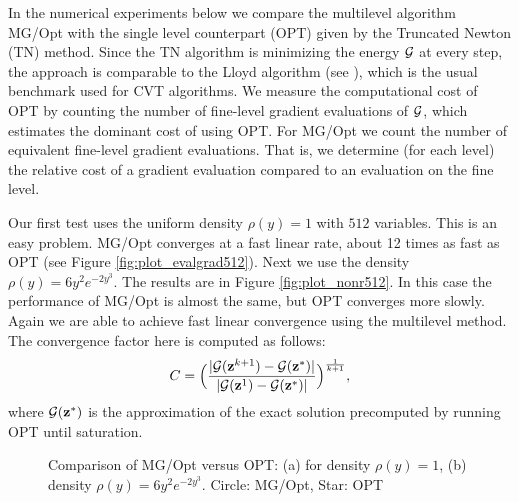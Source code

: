 \documentclass{siamltex}
\newcommand{\ds}{\displaystyle}
\begin{document}
In the numerical experiments below we compare the multilevel algorithm MG/Opt with the single level %
counterpart (OPT) given by the Truncated Newton (TN) method. Since the TN algorithm is minimizing the %
energy $\cg$ at every step, the approach is comparable %
to the Lloyd algorithm (see \cite{DEJ}), which is the usual benchmark used for CVT algorithms.  We measure the computational cost of OPT by counting the number of fine-level gradient evaluations of $\cg$, which estimates the dominant cost of using OPT.  For MG/Opt we count the number of equivalent fine-level gradient evaluations.  That is, we determine (for each level) the relative cost of a gradient evaluation compared to an evaluation on the fine level.

Our first test uses the uniform density $\rho(y) = 1$ with $512$ variables.  This is an easy problem.  MG/Opt converges at a fast linear rate, about 12 times as fast as OPT  (see Figure \ref{fig:plot_evalgrad512}). Next we use the density $\rho(y)=6y^{2}e^{-2y^{3}}$.  The results are in Figure \ref{fig:plot_nonr512}.  In this case the performance of MG/Opt is almost the same, but OPT converges more slowly.  Again we are able to achieve fast linear convergence using the multilevel method. The convergence factor here is computed as follows:
\begin{equation}
\ds C=\Big(\frac{|\cg(\bz^{k+1})-\cg(\bz^{*})| }{|\cg(\bz^{1})-\cg(\bz^{*})| }\Big)^\frac{1}{k+1},
\label{C2}
\end{equation}
where $\cg(\bz^{*})$ is the approximation of the exact solution precomputed by running OPT until saturation.

\begin{figure}[h]
  \centering
  \caption{Comparison of MG/Opt versus OPT: (a) for density $\rho(y) = 1$, (b) density $\rho(y) = 6y^{2}e^{-2y^{3}}$.    Circle: MG/Opt, Star: OPT}
  \label{fig:unieval}
\end{figure}
\end{document}
